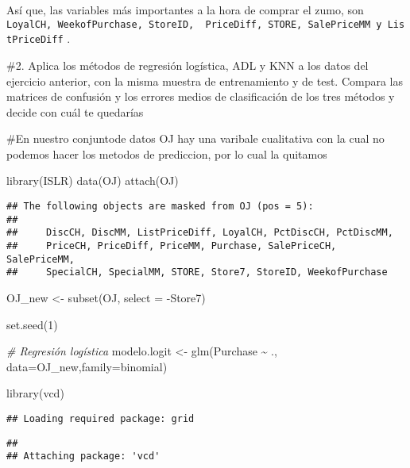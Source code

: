 \documentclass[
]{article}
\newenvironment{Shaded}{\begin{snugshade}}{\end{snugshade}}
\newcommand{\AttributeTok}[1]{\textcolor[rgb]{0.77,0.63,0.00}{#1}}
\newcommand{\CommentTok}[1]{\textcolor[rgb]{0.56,0.35,0.01}{\textit{#1}}}
\newcommand{\DecValTok}[1]{\textcolor[rgb]{0.00,0.00,0.81}{#1}}
\newcommand{\FunctionTok}[1]{\textcolor[rgb]{0.00,0.00,0.00}{#1}}
\newcommand{\NormalTok}[1]{#1}
\newcommand{\OtherTok}[1]{\textcolor[rgb]{0.56,0.35,0.01}{#1}}
\newcommand{\SpecialCharTok}[1]{\textcolor[rgb]{0.00,0.00,0.00}{#1}}
\begin{document}
Así que, las variables más importantes a la hora de comprar el zumo, son
\texttt{LoyalCH,\ WeekofPurchase,\ StoreID,\ \ PriceDiff,\ STORE,\ SalePriceMM\ y\ ListPriceDiff}
.

\#2. Aplica los métodos de regresión logística, ADL y KNN a los datos
del ejercicio anterior, con la misma muestra de entrenamiento y de test.
Compara las matrices de confusión y los errores medios de clasificación
de los tres métodos y decide con cuál te quedarías

\#En nuestro conjuntode datos OJ hay una varibale cualitativa con la
cual no podemos hacer los metodos de prediccion, por lo cual la quitamos

\begin{Shaded}
\begin{Highlighting}[]
\FunctionTok{library}\NormalTok{(ISLR)}
\FunctionTok{data}\NormalTok{(OJ)}
\FunctionTok{attach}\NormalTok{(OJ)}
\end{Highlighting}
\end{Shaded}

\begin{verbatim}
## The following objects are masked from OJ (pos = 5):
## 
##     DiscCH, DiscMM, ListPriceDiff, LoyalCH, PctDiscCH, PctDiscMM,
##     PriceCH, PriceDiff, PriceMM, Purchase, SalePriceCH, SalePriceMM,
##     SpecialCH, SpecialMM, STORE, Store7, StoreID, WeekofPurchase
\end{verbatim}

\begin{Shaded}
\begin{Highlighting}[]
\NormalTok{OJ\_new }\OtherTok{\textless{}{-}} \FunctionTok{subset}\NormalTok{(OJ, }\AttributeTok{select =} \SpecialCharTok{{-}}\NormalTok{Store7)}

\FunctionTok{set.seed}\NormalTok{(}\DecValTok{1}\NormalTok{)}

\CommentTok{\# Regresión logística}
\NormalTok{modelo.logit }\OtherTok{\textless{}{-}} \FunctionTok{glm}\NormalTok{(Purchase }\SpecialCharTok{\textasciitilde{}}\NormalTok{ ., }\AttributeTok{data=}\NormalTok{OJ\_new,}\AttributeTok{family=}\NormalTok{binomial)}

\FunctionTok{library}\NormalTok{(vcd)}
\end{Highlighting}
\end{Shaded}

\begin{verbatim}
## Loading required package: grid
\end{verbatim}

\begin{verbatim}
## 
## Attaching package: 'vcd'
\end{verbatim}
\end{document}
